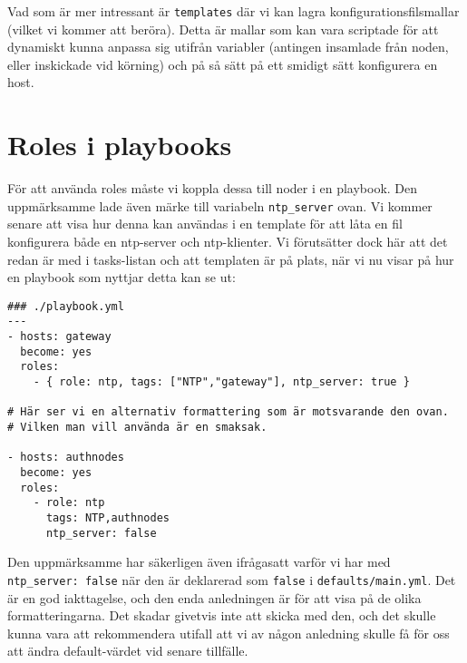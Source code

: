 Vad som är mer intressant är \texttt{templates} där vi kan lagra konfigurationsfilsmallar (vilket vi kommer att 
beröra). Detta är mallar som kan vara scriptade för att dynamiskt kunna anpassa sig utifrån variabler (antingen
insamlade från noden, eller inskickade vid körning) och på så sätt på ett smidigt sätt konfigurera en host.

\section{Roles i playbooks}
För att använda roles måste vi koppla dessa till noder i en playbook. Den uppmärksamme lade även märke till
variabeln \texttt{ntp\_server} ovan. Vi kommer senare att visa hur denna kan användas i en template för att
låta en fil konfigurera både en ntp-server och ntp-klienter. Vi förutsätter dock här att det redan är med i 
tasks-listan och att templaten är på plats, när vi nu visar på hur en playbook som nyttjar detta kan se ut:

\begin{verbatim}
### ./playbook.yml
---
- hosts: gateway
  become: yes
  roles:
    - { role: ntp, tags: ["NTP","gateway"], ntp_server: true }

# Här ser vi en alternativ formattering som är motsvarande den ovan. 
# Vilken man vill använda är en smaksak.

- hosts: authnodes
  become: yes
  roles:
    - role: ntp
      tags: NTP,authnodes
      ntp_server: false
\end{verbatim}

Den uppmärksamme har säkerligen även ifrågasatt varför vi har med \texttt{ntp\_server: false} när den är deklarerad
som \texttt{false} i \texttt{defaults/main.yml}. Det är en god iakttagelse, och den enda anledningen är för att 
visa på de olika formatteringarna. Det skadar givetvis inte att skicka med den, och det skulle kunna vara att 
rekommendera utifall att vi av någon anledning skulle få för oss att ändra default-värdet vid senare tillfälle.
